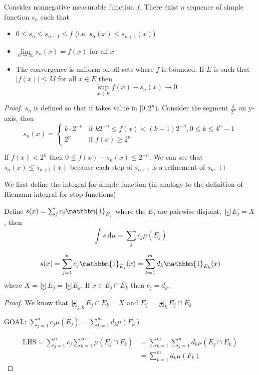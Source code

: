 \begin{theorem}
  Consider nonnegative measurable function $f$.
  There exist a sequence of simple function $s_n$ such that 
  \begin{itemize}
    \item $0 \le s_n \le s_{n+1} \le f$ (i.e, $s_n(x) \le s_{n+1}(x)$)
    \item $\lim\limits_{n\to\infty}s_n(x) = f(x)$ for all $x$
    \item The convergence is uniform on all sets where $f$ is bounded.
    If $E$ is such that $|f(x)| \le M$ for all $x \in E$ then
    \[\sup_{x \in E} f(x) - s_n(x) \to 0\]
  \end{itemize}
\end{theorem}

\begin{proof}
  $s_n$ is defined so that if takes value in $[0, 2^n)$. Consider the segment $\frac{k}{2^n}$ on y-axis,
  then $$s_n(x) = \begin{cases}
    k\cdot2^{-n} & \text{if } k2^{-n} \le f(x) < (k+1)2^{-n}, 0 \le k \le 4^n - 1 \\
    2^n & \text{if } f(x) \ge 2^n
  \end{cases}$$

If $f(x) < 2^n$ then $0 \le f(x) - s_n(x) \le 2^{-n}$. We can see that $s_n(x) \le s_{n+1}(x)$ because
each step of $s_{n+1}$ is a refinement of $s_n$.
\end{proof}

We first define the integral for simple function (in analogy to the definition of Riemann-integral for stop functions)
\begin{definition}
  Define 
  $s(x) = \sum_j c_j \mathbbm{1}_{E_j}$
  where the $E_j$ are pairwise disjoint, $\biguplus E_j = X$, then
  \[\int s \ \mathrm{d}\mu = \sum_j c_j \mu(E_j)\]
\end{definition}

\begin{claim}
  $$s(x) = \sum_{j=1}^n c_j\mathbbm{1}_{E_j}(x) = \sum_{k = 1}^m d_k \mathbbm{1}_{E_k}(x)$$
  where $X = \biguplus E_j = \biguplus E_k$. If $x \in E_j \cap E_k$ then $c_j = d_k$.
\end{claim}

\begin{proof}
  We know that $\biguplus_{j, k} E_j \cap E_k = X$ and $E_j = \biguplus_{k} E_j \cap E_k$

  GOAL: $\sum_{j=1}^n c_j\mu(E_j) = \sum_{k=1}^m d_k \mu(F_k)$

  \begin{align*}
    \text{LHS}=\sum_{j=1}^n c_j \sum_{k=1}^\infty \mu(E_j \cap F_k) &= \sum_{k=1}^m \sum_{j=1}^n d_k \mu(E_j \cap E_k) \\
    &= \sum_{k=1}^m d_k \mu(F_k)
  \end{align*}
\end{proof}


